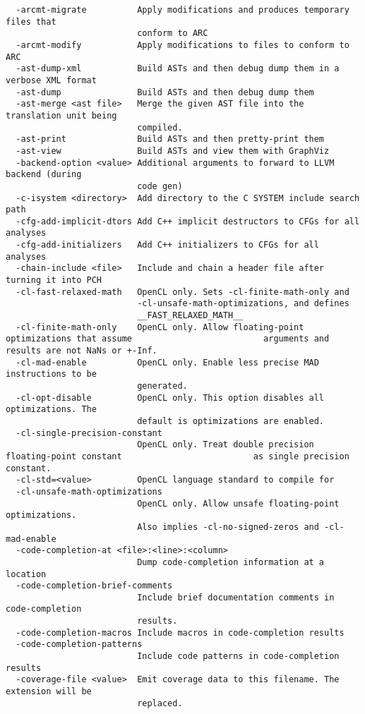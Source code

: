 \begin{verbatim}
  -arcmt-migrate          Apply modifications and produces temporary files that 
                          conform to ARC
  -arcmt-modify           Apply modifications to files to conform to ARC
  -ast-dump-xml           Build ASTs and then debug dump them in a verbose XML format
  -ast-dump               Build ASTs and then debug dump them
  -ast-merge <ast file>   Merge the given AST file into the translation unit being 
                          compiled.
  -ast-print              Build ASTs and then pretty-print them
  -ast-view               Build ASTs and view them with GraphViz
  -backend-option <value> Additional arguments to forward to LLVM backend (during 
                          code gen)
  -c-isystem <directory>  Add directory to the C SYSTEM include search path
  -cfg-add-implicit-dtors Add C++ implicit destructors to CFGs for all analyses
  -cfg-add-initializers   Add C++ initializers to CFGs for all analyses
  -chain-include <file>   Include and chain a header file after turning it into PCH
  -cl-fast-relaxed-math   OpenCL only. Sets -cl-finite-math-only and 
                          -cl-unsafe-math-optimizations, and defines 
                          __FAST_RELAXED_MATH__
  -cl-finite-math-only    OpenCL only. Allow floating-point optimizations that assume                          arguments and results are not NaNs or +-Inf.
  -cl-mad-enable          OpenCL only. Enable less precise MAD instructions to be 
                          generated.
  -cl-opt-disable         OpenCL only. This option disables all optimizations. The 
                          default is optimizations are enabled.
  -cl-single-precision-constant
                          OpenCL only. Treat double precision floating-point constant                          as single precision constant.
  -cl-std=<value>         OpenCL language standard to compile for
  -cl-unsafe-math-optimizations
                          OpenCL only. Allow unsafe floating-point optimizations.  
                          Also implies -cl-no-signed-zeros and -cl-mad-enable
  -code-completion-at <file>:<line>:<column>
                          Dump code-completion information at a location
  -code-completion-brief-comments
                          Include brief documentation comments in code-completion 
                          results.
  -code-completion-macros Include macros in code-completion results
  -code-completion-patterns
                          Include code patterns in code-completion results
  -coverage-file <value>  Emit coverage data to this filename. The extension will be 
                          replaced.

\end{verbatim}
